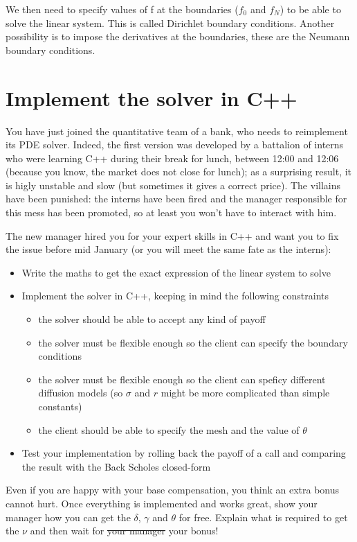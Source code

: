 \documentclass[a4paper]{article}
\begin{document}
We then need to specify values of f at the boundaries ($f_0$ and $f_N$) to be able to solve the linear system. This is called Dirichlet boundary conditions. Another possibility is to impose the derivatives at the boundaries, these are the Neumann boundary conditions.

\section{Implement the solver in C++}

You have just joined the quantitative team of a bank, who needs to reimplement its PDE solver. Indeed, the first version was developed by a battalion of
interns who were learning C++ during their break for lunch, between 12:00 and 12:06 (because you know, the market does not close for lunch); as a surprising result, it is higly unstable and slow (but sometimes it gives a correct price). The villains have been punished: the interns have been fired and the manager responsible for this mess has been promoted, so at least you won't have to interact with him.

The new manager hired you for your expert skills in C++ and want you to fix the issue before mid January (or you will meet the same fate as the interns):

\begin{itemize}
\item Write the maths to get the exact expression of the linear system to solve
\item Implement the solver in C++, keeping in mind the following constraints
\begin{itemize}
\item the solver should be able to accept any kind of payoff
\item the solver must be flexible enough so the client can specify the boundary conditions
\item the solver must be flexible enough so the client can speficy different diffusion models (so $\sigma$ and $r$ might be more complicated than simple constants)
\item the client should be able to specify the mesh and the value of $\theta$
\end{itemize}
\item Test your implementation by rolling back the payoff of a call and comparing the result with the Back Scholes closed-form
\end{itemize}

Even if you are happy with your base compensation, you think an extra bonus cannot hurt. Once everything is implemented and works great, show your
manager how you can get the $\delta$, $\gamma$ and $\theta$ for free. Explain what is required to get the $\nu$ and then wait for \st{your manager}
your bonus!
\end{document}
